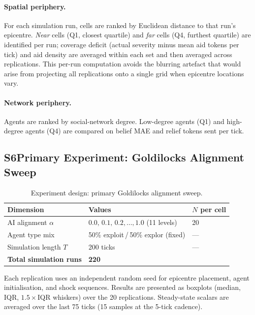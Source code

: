 \documentclass[pdflatex,sn-apa]{sn-jnl}%
\begin{document}
\begin{appendices}
\paragraph{Spatial periphery.}
For each simulation run, cells are ranked by Euclidean distance to that run's
epicentre.
\emph{Near} cells (Q1, closest quartile) and \emph{far} cells (Q4, furthest
quartile) are identified per run; coverage deficit (actual severity minus mean
aid tokens per tick) and aid density are averaged within each set and then
averaged across replications.
This per-run computation avoids the blurring artefact that would arise from
projecting all replications onto a single grid when epicentre locations vary.

\paragraph{Network periphery.}
Agents are ranked by social-network degree.
Low-degree agents (Q1) and high-degree agents (Q4) are compared on belief MAE
and relief tokens sent per tick.

\subsection*{S6\quad Primary Experiment: Goldilocks Alignment Sweep}

\begin{table}[h]
\centering
\caption{Experiment design: primary Goldilocks alignment sweep.}
\label{tab:S6}
\begin{tabular}{lll}
\toprule
Dimension & Values & $N$ per cell \\
\midrule
AI alignment $\alpha$
  & $0.0,\,0.1,\,0.2,\ldots,1.0$ (11 levels) & 20 \\
Agent type mix
  & 50\% exploit\,/\,50\% explor (fixed) & --- \\
Simulation length $T$
  & 200 ticks & --- \\
\midrule
\textbf{Total simulation runs} & \multicolumn{2}{l}{\textbf{220}} \\
\bottomrule
\end{tabular}
\end{table}

Each replication uses an independent random seed for epicentre placement, agent
initialisation, and shock sequences.
Results are presented as boxplots (median, IQR, $1.5\times$IQR whiskers) over the
20 replications.
Steady-state scalars are averaged over the last 75 ticks (15 samples at the
5-tick cadence).


\end{appendices}
\end{document}
